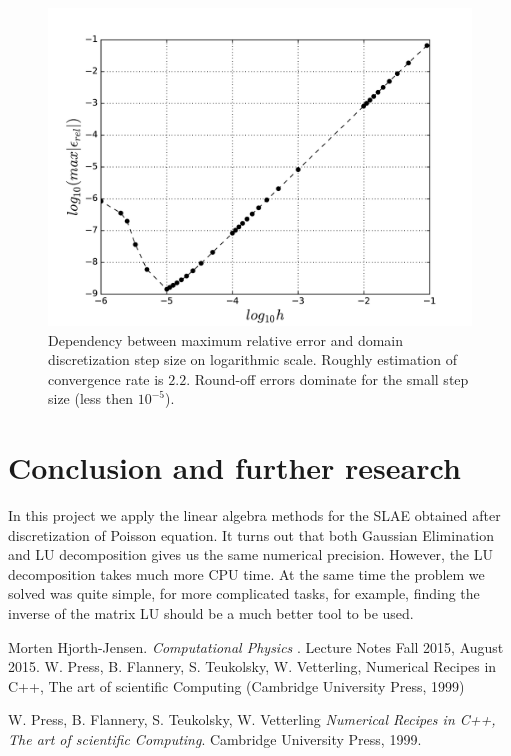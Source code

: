 \documentclass[10pt]{article}
\begin{document}
\begin{figure}
  \begin{center}
    \includegraphics[scale=0.7]{relative_error_log}
    \caption{Dependency between maximum relative error and domain discretization step size on logarithmic scale. Roughly estimation of convergence rate is $2.2$. Round-off errors dominate for the small step size (less then $10^{-5}$).}
    \label{fig:error}
  \end{center}
\end{figure}
\newpage
\section{Conclusion and further research}
In this project we apply the linear algebra methods for the SLAE obtained after discretization of Poisson equation. It turns out that both Gaussian Elimination and LU decomposition gives us the same numerical precision. However, the LU decomposition takes much more CPU time. At the same time the problem we solved was quite simple, for more complicated tasks, for example, finding the inverse of the matrix LU should be a much better tool to be used.

\newpage
\begin{thebibliography}{9}
Morten Hjorth-Jensen. 
\textit{Computational Physics
}. 
Lecture Notes Fall 2015, August 2015.
 W. Press, B. Flannery, S. Teukolsky, W. Vetterling, Numerical Recipes in C++, The art of scientific Computing (Cambridge University Press, 1999)

W. Press, B. Flannery, S. Teukolsky, W. Vetterling 
\textit{Numerical Recipes in C++, The art of scientific Computing}. 
Cambridge University Press, 1999.
 
\end{thebibliography}
\end{document}
